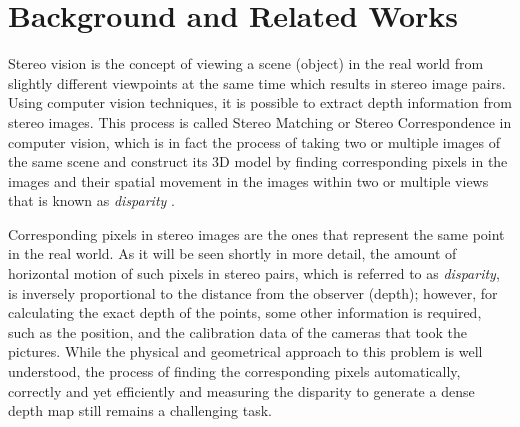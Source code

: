 \documentclass[dvips,letterpaper,12pt]{report}
\begin{document}
\chapter{Background and Related Works}
Stereo vision is the concept of viewing a scene (object) in the real world from slightly different
viewpoints at the same time which results in stereo image
pairs. Using computer vision techniques, it is possible to extract depth information from stereo
images. This process is called Stereo Matching or Stereo Correspondence in computer vision,
which is in fact the process of taking two or multiple images of the same scene and construct its
3D model by finding corresponding pixels in the images and their spatial movement in the images within two or multiple views that is known as {\it disparity} \cite{sze11}.

Corresponding pixels in stereo images are the ones that represent the same point in the real
world. As it will be seen shortly in more detail, the amount of horizontal motion of such pixels
in stereo pairs, which is referred to as {\it disparity}, is inversely proportional to the
distance from the observer (depth); however, for calculating the exact depth of the points, some
other information is required, such as the position, and the calibration data of the cameras that took the pictures.
While the physical and geometrical approach to this problem is well understood, the process of finding the corresponding pixels automatically, correctly and yet efficiently
and measuring the disparity to generate a dense depth map still remains a challenging task.



 
\end{document}
